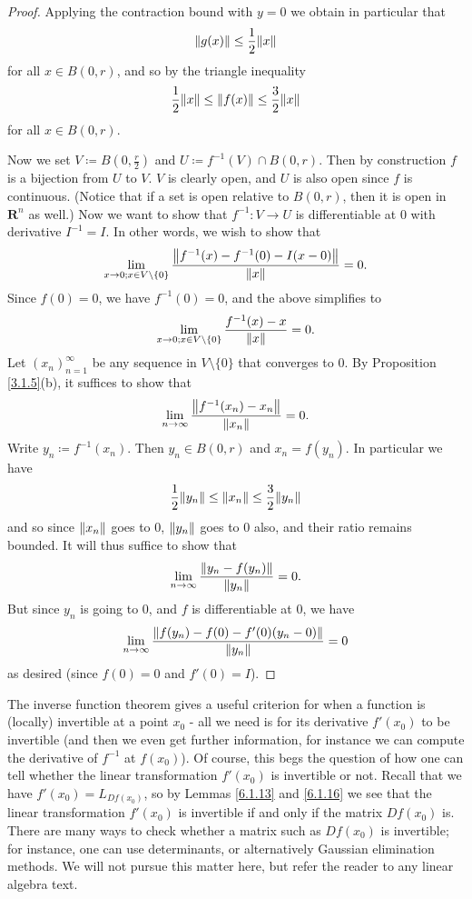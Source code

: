 \begin{proof}
    Applying the contraction bound with \(y = 0\) we obtain in particular that
    \[
        \norm*{g(x)} \leq \frac{1}{2} \norm*{x}
    \]
    for all \(x \in B(0, r)\), and so by the triangle inequality
    \[
        \frac{1}{2} \norm*{x} \leq \norm*{f(x)} \leq \frac{3}{2} \norm*{x}
    \]
    for all \(x \in B(0, r)\).

    Now we set \(V \coloneqq B(0, \frac{r}{2})\) and \(U \coloneqq f^{-1}(V) \cap B(0, r)\).
    Then by construction \(f\) is a bijection from \(U\) to \(V\).
    \(V\) is clearly open, and \(U\) is also open since \(f\) is continuous.
    (Notice that if a set is open relative to \(B(0, r)\), then it is open in \(\mathbf{R}^n\) as well.)
    Now we want to show that \(f^{-1} : V \to U\) is differentiable at \(0\) with derivative \(I^{-1} = I\).
    In other words, we wish to show that
    \[
        \lim_{x \to 0 ; x \in V \setminus \{0\}} \frac{\norm*{f^{-1}(x) - f^{-1}(0) - I(x - 0)}}{\norm*{x}} = 0.
    \]
    Since \(f(0) = 0\), we have \(f^{-1}(0) = 0\), and the above simplifies to
    \[
        \lim_{x \to 0 ; x \in V \setminus \{0\}} \frac{f^{-1}(x) - x}{\norm*{x}} = 0.
    \]
    Let \((x_n)_{n = 1}^\infty\) be any sequence in \(V \setminus \{0\}\) that converges to \(0\).
    By Proposition \ref{3.1.5}(b), it suffices to show that
    \[
        \lim_{n \to \infty} \frac{\norm*{f^{-1}(x_n) - x_n}}{\norm*{x_n}} = 0.
    \]
    Write \(y_n \coloneqq f^{-1}(x_n)\).
    Then \(y_n \in B(0, r)\) and \(x_n = f(y_n)\).
    In particular we have
    \[
        \frac{1}{2} \norm*{y_n} \leq \norm*{x_n} \leq \frac{3}{2} \norm*{y_n}
    \]
    and so since \(\norm*{x_n}\) goes to \(0\), \(\norm*{y_n}\) goes to \(0\) also, and their ratio remains bounded.
    It will thus suffice to show that
    \[
        \lim_{n \to \infty} \frac{\norm*{y_n - f(y_n)}}{\norm*{y_n}} = 0.
    \]
    But since \(y_n\) is going to \(0\), and \(f\) is differentiable at \(0\), we have
    \[
        \lim_{n \to \infty} \frac{\norm*{f(y_n) - f(0) - f'(0)(y_n - 0)}}{\norm*{y_n}} = 0
    \]
    as desired (since \(f(0) = 0\) and \(f'(0) = I\)).
\end{proof}

\begin{note}
    The inverse function theorem gives a useful criterion for when a function is (locally) invertible at a point \(x_0\)
    - all we need is for its derivative \(f'(x_0)\) to be invertible
    (and then we even get further information, for instance we can compute the derivative of \(f^{-1}\) at \(f(x_0)\)).
    Of course, this begs the question of how one can tell whether the linear transformation \(f'(x_0)\) is invertible or not.
    Recall that we have \(f'(x_0) = L_{D f(x_0)}\), so by Lemmas \ref{6.1.13} and \ref{6.1.16} we see that the linear transformation \(f'(x_0)\) is invertible if and only if the matrix \(D f(x_0)\) is.
    There are many ways to check whether a matrix such as \(D f(x_0)\) is invertible;
    for instance, one can use determinants, or alternatively Gaussian elimination methods.
    We will not pursue this matter here, but refer the reader to any linear algebra text.
\end{note}

